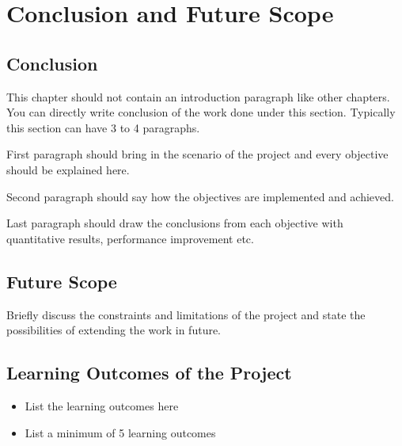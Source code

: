 \chapter{Conclusion and Future Scope}

\section{Conclusion}
This chapter should not contain an introduction paragraph like other chapters. You can directly write conclusion of the work done under this section. Typically this section can have 3 to 4 paragraphs. 

First paragraph should bring in the scenario of the project and every objective should be explained here.

Second paragraph should say how the objectives are implemented and achieved.

Last paragraph should draw the conclusions from each objective with quantitative results, performance improvement etc. 

\section{Future Scope}
Briefly discuss the constraints and limitations of the project and state the possibilities of extending the work in future.
\section{Learning Outcomes of the Project}
\begin{itemize}
\item List the learning outcomes here
\item List a minimum of 5 learning outcomes
\end{itemize}

